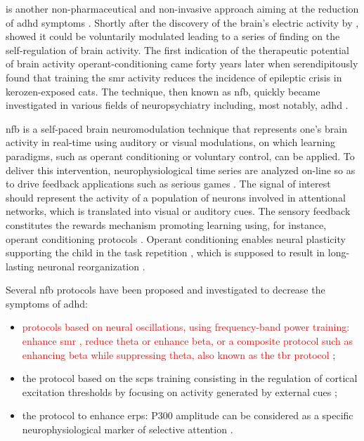  is another non-pharmaceutical and non-invasive approach aiming at the reduction of \gls{adhd} symptoms 
\citep{Arns2015, Steffert2010, Marzbani2016}. Shortly after the discovery of the brain's electric activity by 
\citet{Berger1929}, \citet{Durup1935} showed it could be voluntarily modulated leading to a series of finding on the 
self-regulation of brain activity. The first indication of the therapeutic potential of brain activity operant-conditioning 
came forty years later when \citet{Sterman1974} serendipitously found that training the \gls{smr} activity reduces the incidence 
of epileptic crisis in kerozen-exposed cats. The technique, then known as \gls{nfb}, quickly became investigated in various 
fields of neuropsychiatry including, most notably, \gls{adhd} \citep{Lubar1976, Rossiter1995, Linden1996, Maurizio2014}.

\gls{nfb} is a self-paced brain neuromodulation technique that represents one's brain activity in real-time using auditory 
or visual modulations, on which learning paradigms, such as operant conditioning
\citep{Reynolds1975} or voluntary control, can be applied. To deliver this intervention, neurophysiological time series 
are analyzed on-line so as to drive feedback applications such as serious games \citep{Wang2010}. 
The signal of interest should represent the activity of a population of neurons involved in attentional networks, which is translated into 
visual or auditory cues. The sensory feedback constitutes the rewards mechanism promoting learning using, for instance, operant conditioning 
protocols \citep{Sherlin2011}. Operant conditioning enables neural plasticity supporting the child in the task repetition \citep{Skinner1961}, 
which is supposed to result in long-lasting neuronal reorganization \citep{VanDoren2017}. 

Several \gls{nfb} protocols have been proposed and investigated to decrease the symptoms of \gls{adhd}:
\begin{itemize} 
  \item \textcolor{red}{protocols based on neural oscillations, using frequency-band power training: enhance \gls{smr} \citep{Beauregard2006}, reduce theta 
	  or enhance beta, or a composite protocol such as enhancing beta while suppressing theta, also known as the \gls{tbr}
    protocol} \citep{Lubar1976, Arns2013}; 
  \item the protocol based on the \glspl{scp} training consisting in the regulation of
    cortical excitation thresholds by focusing on activity generated by external cues 
    \citep{Heinrich2004, Banaschewski2007}; 
  \item the protocol to enhance \glspl{erp}: P300 amplitude can be considered as a specific
    neurophysiological marker of selective attention \citep{Fouillen2017}.  
\end{itemize} 

